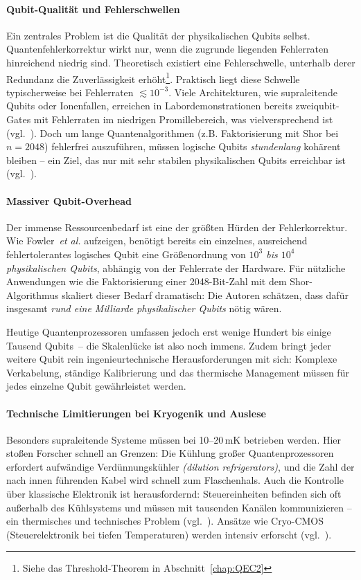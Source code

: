\paragraph{Qubit-Qualit\"at und Fehlerschwellen} 
Ein zentrales Problem ist die Qualit\"at der physikalischen Qubits selbst. Quantenfehlerkorrektur wirkt nur, wenn die zugrunde liegenden Fehlerraten hinreichend niedrig sind. Theoretisch existiert eine Fehlerschwelle, unterhalb derer Redundanz die Zuverl\"assigkeit erh\"oht\footnote{Siehe das Threshold-Theorem in Abschnitt~\ref{chap:QEC2}}. Praktisch liegt diese Schwelle typischerweise bei Fehlerraten $\lesssim 10^{-3}$. Viele Architekturen, wie supraleitende Qubits oder Ionenfallen, erreichen in Labordemonstrationen bereits zweiqubit-Gates mit Fehlerraten im niedrigen Promillebereich, was vielversprechend ist (vgl.~\cite{noauthor_quantinuum_2022}). Doch um lange Quantenalgorithmen (z.B. Faktorisierung mit Shor bei $n=2048$) fehlerfrei auszuf\"uhren, m\"ussen logische Qubits \emph{stundenlang} koh\"arent bleiben -- ein Ziel, das nur mit sehr stabilen physikalischen Qubits erreichbar ist (vgl.~\cite{gidney_how_2021}).

\paragraph{Massiver Qubit-Overhead}
Der immense Ressourcenbedarf ist eine der größten Hürden der Fehlerkorrektur. 
Wie Fowler~\textit{et al.} aufzeigen, benötigt bereits ein einzelnes, 
ausreichend fehlertolerantes logisches Qubit eine Größenordnung von 
\emph{$10^3$ bis $10^4$ physikalischen Qubits}, abhängig von der Fehlerrate der Hardware. 
Für nützliche Anwendungen wie die Faktorisierung einer 2048-Bit-Zahl mit dem Shor-Algorithmus 
skaliert dieser Bedarf dramatisch: Die Autoren schätzen, dass dafür insgesamt 
\emph{rund eine Milliarde physikalischer Qubits} nötig wären.

Heutige Quantenprozessoren umfassen jedoch erst wenige Hundert bis einige Tausend Qubits~-- 
die Skalenlücke ist also noch immens. Zudem bringt jeder weitere Qubit rein 
ingenieurtechnische Herausforderungen mit sich: Komplexe Verkabelung, 
ständige Kalibrierung und das thermische Management müssen für jedes einzelne 
Qubit gewährleistet werden.

\paragraph{Technische Limitierungen bei Kryogenik und Auslese}
Besonders supraleitende Systeme m\"ussen bei 10--20\,mK betrieben werden. Hier stoßen Forscher schnell an Grenzen: Die K\"uhlung gro\ss er Quantenprozessoren erfordert aufw\"andige Verd\"unnungsk\"uhler \emph{(dilution refrigerators)}, und die Zahl der nach innen f\"uhrenden Kabel wird schnell zum Flaschenhals.  Auch die Kontrolle \"uber klassische Elektronik ist herausfordernd: Steuereinheiten befinden sich oft au\ss erhalb des K\"uhlsystems und m\"ussen mit tausenden Kan\"alen kommunizieren -- ein thermisches und technisches Problem (vgl.~\cite[1]{krinner_engineering_2019}). Ans\"atze wie Cryo-CMOS (Steuerelektronik bei tiefen Temperaturen) werden intensiv erforscht (vgl.~\cite[13.5.1-13.5.2]{charbon_cryo-cmos_2016}).

